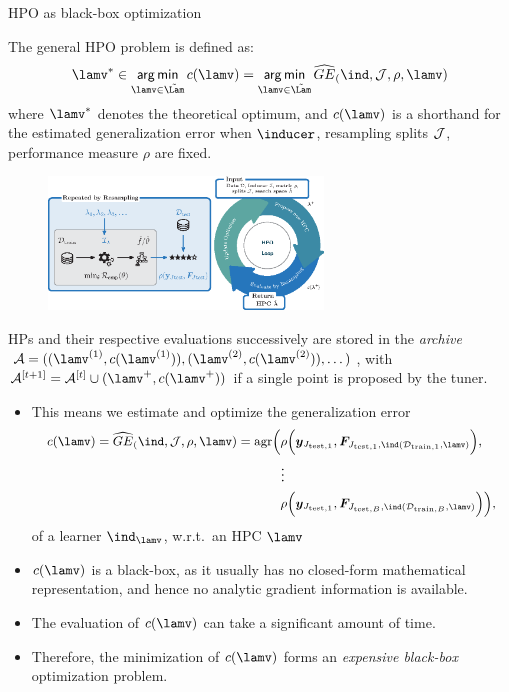\documentclass[11pt,compress,t,notes=noshow, xcolor=table]{beamer}
\begin{document}
\begin{vbframe}{HPO as black-box optimization}
\framebreak
\begin{footnotesize}
The general HPO problem is defined as:
\begin{eqnarray*}
    \lams \in \argmin_{\lamv \in \LamS} \clam = \argmin_{\lamv \in \LamS} 
    \GEhresa
\end{eqnarray*}
where $\lams$ denotes the theoretical optimum, and $\clam$ is a shorthand for the estimated generalization error when $\inducer$, resampling splits $\mathcal{J}$, performance measure $\rho$ are fixed.

\begin{figure}[h]
    \centering
    \includegraphics[width = 0.65\textwidth]{figure/hpo_loop_1.eps}
\end{figure}

HPs and their respective evaluations successively are stored  in the \textit{archive} $\archive = ((\lamv^{(1)}, c(\lamv^{(1)})), (\lamv^{(2)}, c(\lamv^{(2)})), \dots)$, with $\archivet[t+1] = \archivet[t] \cup (\lamp, \clamp)$ if a single point is proposed by the tuner.
\end{footnotesize}
\framebreak

\begin{itemize}
\item This means we estimate and optimize the generalization error 
\begin{equation*}
\small
\begin{split}
\clam = \GEhresa = \agr\Big(
 &\rho\Big(\yv_{\Jtesti[1]}, \FJtestftraini[1]\Big), \\ &\large{\vdots} \\
& \rho\Big(\yv_{\Jtesti[1]}, \FJtestftraini[B]\Big)
    \Big),
\end{split}
\end{equation*}
of a learner $\Ilam$, w.r.t.\ an HPC $\lamv$
\item  $\clam$ is a black-box, as it usually has no closed-form mathematical representation, and hence no analytic gradient information is available. 
\item The evaluation of $\clam$ can take a significant amount of time.
\item Therefore, the minimization of $\clam$ forms an \emph{expensive black-box} optimization problem.
\end{itemize}

\end{vbframe}
\end{document}
